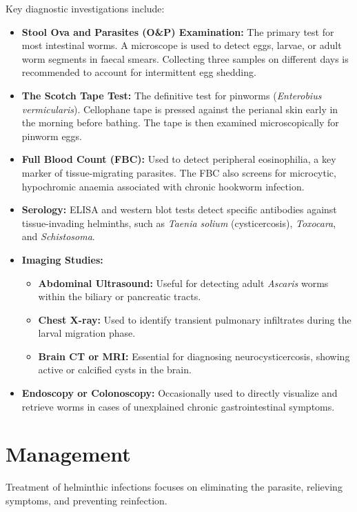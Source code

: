 Key diagnostic investigations include:
\begin{itemize}
    \item \textbf{Stool Ova and Parasites (O\&P) Examination:} The primary test for most intestinal worms. A microscope is used to detect eggs, larvae, or adult worm segments in faecal smears. Collecting three samples on different days is recommended to account for intermittent egg shedding.
    \item \textbf{The Scotch Tape Test:} The definitive test for pinworms (\textit{Enterobius vermicularis}). Cellophane tape is pressed against the perianal skin early in the morning before bathing. The tape is then examined microscopically for pinworm eggs.
    \item \textbf{Full Blood Count (FBC):} Used to detect peripheral eosinophilia, a key marker of tissue-migrating parasites. The FBC also screens for microcytic, hypochromic anaemia associated with chronic hookworm infection.
    \item \textbf{Serology:} ELISA and western blot tests detect specific antibodies against tissue-invading helminths, such as \textit{Taenia solium} (cysticercosis), \textit{Toxocara}, and \textit{Schistosoma}.
    \item \textbf{Imaging Studies:}
    \begin{itemize}
        \item \textbf{Abdominal Ultrasound:} Useful for detecting adult \textit{Ascaris} worms within the biliary or pancreatic tracts.
        \item \textbf{Chest X-ray:} Used to identify transient pulmonary infiltrates during the larval migration phase.
        \item \textbf{Brain CT or MRI:} Essential for diagnosing neurocysticercosis, showing active or calcified cysts in the brain.
    \end{itemize}
    \item \textbf{Endoscopy or Colonoscopy:} Occasionally used to directly visualize and retrieve worms in cases of unexplained chronic gastrointestinal symptoms.
\end{itemize}

\section*{Management}
Treatment of helminthic infections focuses on eliminating the parasite, relieving symptoms, and preventing reinfection.

